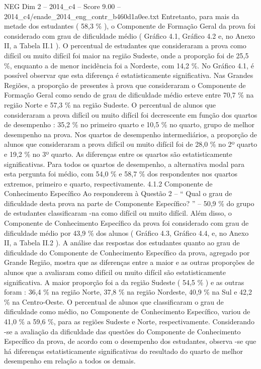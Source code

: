 \begin{textsample}{NEG Dim 2 – 2014\_c4 – Score 9.00 – 2014\_c4/enade\_2014\_eng\_contr\_b460d1a0ee.txt}
Entretanto, para mais da metade dos estudantes ( 58,3 \% ), o Componente de Formação Geral da prova foi considerado com grau de dificuldade médio ( Gráfico 4.1, Gráfico 4.2 e, no Anexo II, a Tabela II.1 ).
O percentual de estudantes que consideraram a prova como difícil ou muito difícil foi maior na região Sudeste, onde a proporção foi de 25,5 \%, enquanto a de menor incidência foi a Nordeste, com 14,2 \%.
No Gráfico 4.1, é possível observar que esta diferença é estatisticamente significativa.
Nas Grandes Regiões, a proporção de presentes à prova que consideraram o Componente de Formação Geral como sendo de grau de dificuldade médio esteve entre 70,7 \% na região Norte e 57,3 \% na região Sudeste.
O percentual de alunos que consideraram a prova difícil ou muito difícil foi decrescente em função dos quartos de desempenho : 35,2 \% no primeiro quarto e 10,5 \% no quarto, grupo de melhor desempenho na prova.
Nos quartos de desempenho intermediários, a proporção de alunos que consideraram a prova difícil ou muito difícil foi de 28,0 \% no 2º quarto e 19,2 \% no 3º quarto.
As diferenças entre os quartos são estatisticamente significativas.
Para todos os quartos de desempenho, a alternativa modal para esta pergunta foi médio, com 54,0 \% e 58,7 \% dos respondentes nos quartos extremos, primeiro e quarto, respectivamente. 4.1.2 Componente de Conhecimento Específico Ao responderem à Questão 2 – “ Qual o grau de dificuldade desta prova na parte de Componente Específico? ” – 50,9 \% do grupo de estudantes classificaram -na como difícil ou muito difícil.
Além disso, o Componente de Conhecimento Específico da prova foi considerado com grau de dificuldade médio por 43,9 \% dos alunos ( Gráfico 4.3, Gráfico 4.4, e, no Anexo II, a Tabela II.2 ).
A análise das respostas dos estudantes quanto ao grau de dificuldade do Componente de Conhecimento Específico da prova, agregado por Grande Região, mostra que as diferenças entre a maior e as outras proporções de alunos que a avaliaram como difícil ou muito difícil são estatisticamente significativa.
A maior proporção foi a da região Sudeste ( 54,5 \% ) e as outras foram : 36,4 \% na região Norte, 37,8 \% na região Nordeste, 40,9 \% na Sul e 42,2 \% na Centro-Oeste.
O percentual de alunos que classificaram o grau de dificuldade como médio, no Componente de Conhecimento Específico, variou de 41,0 \% a 59,6 \%, para as regiões Sudeste e Norte, respectivamente.
Considerando -se a avaliação da dificuldade das questões do Componente de Conhecimento Específico da prova, de acordo com o desempenho dos estudantes, observa -se que há diferenças estatisticamente significativas do resultado do quarto de melhor desempenho em relação a todos os demais.

\end{textsample}
